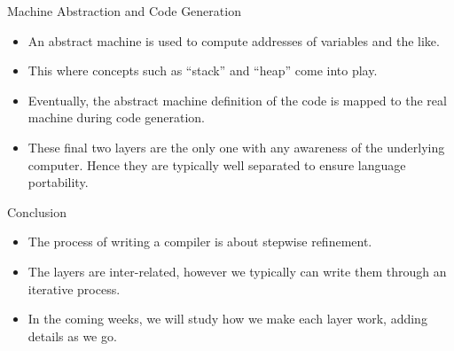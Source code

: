 \documentclass[]{beamer}
\begin{document}
\begin{frame}{Machine Abstraction and Code Generation}
    \begin{itemize}[<+->]
        \item An abstract machine is used to compute addresses of
            variables and the like.
        \item This where concepts such as ``stack'' and ``heap'' come
            into play.
        \item Eventually, the abstract machine definition of the code
            is mapped to the real machine during code generation.
        \item These final two layers are the only one with any
            awareness of the underlying computer.  Hence they are
            typically well separated to ensure language portability.
    \end{itemize}
\end{frame}

\begin{frame}{Conclusion}
    \begin{itemize}[<+->]
        \item The process of writing a compiler is about stepwise
            refinement.
        \item The layers are inter-related, however we typically can
            write them through an iterative process.
        \item In the coming weeks, we will study how we make each
            layer work, adding details as we go.
    \end{itemize}
\end{frame}
\end{document}
